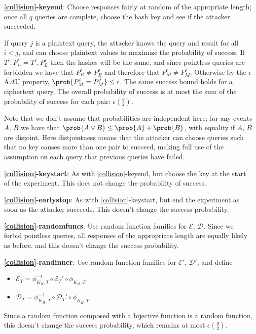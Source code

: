 \documentclass[journal=tosc,preprint,floatrow,submission]{iacrtrans}
\newcommand*{\xprm}[2]{\textsf{\ref*{#1}-#2}}
\newcommand*{\xprmtitle}[2]{\textbf{\xprm{#1}{#2}}}
\newcommand*{\calE}{\mathcal{E}}
\newcommand*{\calD}{\mathcal{D}}
\begin{document}
\xprmtitle{collision}{keyend}: Choose responses fairly at random of the appropriate length;
once all $q$ queries are complete, choose the hash key and see if the attacker succeeded.

If query $j$ is a plaintext query, the attacker knows the query and result
for all $i < j$, and can choose plaintext values to maximize the probability of success.
If $T^i, P_L^i = T^j, P_L^j$ then the hashes will be the same, and since pointless
queries are forbidden we have that $P_R^i \neq P_R^j$ and therefore that
$P_M^i \neq P_M^j$. Otherwise by the $\epsilon$A$\Delta$U property,
$\prob{P_M^i = P_M^j} \leq \epsilon$. The same success bound holds for a ciphertext query.
The overall probability of success
is at most the sum of the probability of success for each pair:
$\epsilon\binom{q}{2}$.

Note that we don't assume that probabilities are independent here;
for any events $A$, $B$ we have that $\prob{A \vee B} \leq \prob{A} + \prob{B}$, with
equality if $A$, $B$ are disjoint. Here distjointness means that the attacker can
choose queries such that no key causes more than one pair to succeed, making full use of
the assumption on each query that previous queries have failed.

\xprmtitle{collision}{keystart}: As with \xprm{collision}{keyend}, but
choose the key at the start of the experiment. This
does not change the probability of success.

\xprmtitle{collision}{earlystop}: As with \xprm{collision}{keystart}, but
end the experiment as soon as the attacker succeeds.
This doesn't change the success probability.

\xprmtitle{collision}{randomfuncs}: Use random function families for $\calE$,
$\calD$. Since we forbid pointless queries,
all responses of the appropriate length are equally likely as before,
and this doesn't change the success probability.

\xprmtitle{collision}{randinner}: Use random function families for $\calE'$, $\calD'$, and define
\begin{itemize}
    \item $\calE_T = \phi^{-1}_{K_H, T} \circ \calE_T' \circ \phi_{K_H, T}$
    \item $\calD_T = \phi^{-1}_{K_H, T} \circ \calD_T' \circ \phi_{K_H, T}$
\end{itemize}

Since a random function composed with a bijective function is a random function,
this doesn't change the success probability, which remains at most
$\epsilon\binom{q}{2}$.
\end{document}
